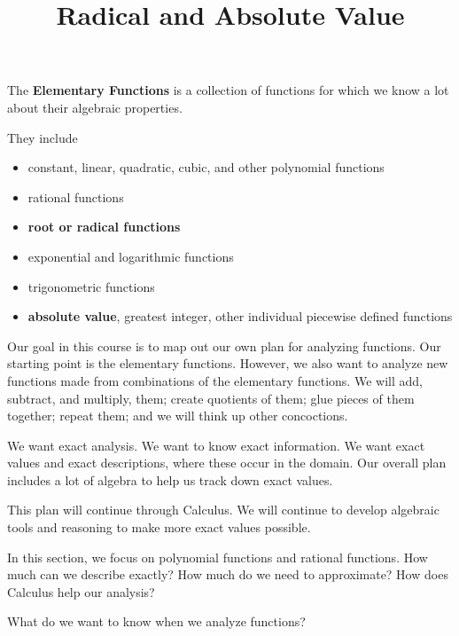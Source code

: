 \documentclass{ximera}
\title{Radical and Absolute Value}
\begin{document}
\begin{abstract}
\end{abstract}
\maketitle




The \textbf{Elementary Functions} is a collection of functions for which we know a lot about their algebraic properties.

They include 

\begin{itemize}
\item constant, linear, quadratic, cubic, and other polynomial functions
\item rational functions
\item \textbf{\textcolor{purple!85!blue}{root or radical functions}} 
\item exponential and logarithmic functions
\item trigonometric functions
\item \textbf{\textcolor{purple!85!blue}{absolute value}}, greatest integer, other individual piecewise defined functions
\end{itemize}








Our goal in this course is to map out our own plan for analyzing functions.  Our starting point is the elementary functions. However, we also want to analyze new functions made from combinations of the elementary functions.  We will add, subtract, and multiply, them; create quotients of them; glue pieces of them together; repeat them; and we will think up other concoctions.

We want exact analysis.  We want to know exact information.  We want exact values and exact descriptions, where these occur in the domain. Our overall plan includes a lot of algebra to help us track down exact values.  


This plan will continue through Calculus.  We will continue to develop algebraic tools and reasoning to make more exact values possible.

In this section, we focus on polynomial functions and rational functions.  How much can we describe exactly? How much do we need to approximate? How does Calculus help our analysis?


What do we want to know when we analyze functions?
\end{document}
